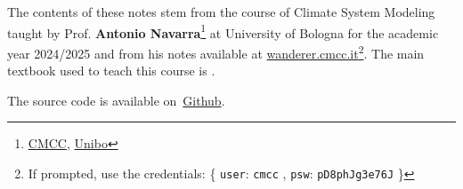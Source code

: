 \documentclass[
    11pt, 
    twoside, 
    english
]{book} %
\begin{document}


\clearpage

\vspace*{\fill}
The contents of these notes stem from the course of Climate System Modeling taught by Prof. \textbf{Antonio Navarra}\footnote{\href{https://www.cmcc.it/people/navarra-a}{CMCC}, \href{https://www.unibo.it/sitoweb/antonio.navarra/en}{Unibo}}
at University of Bologna for the academic year 2024/2025 and from his notes available at
\href{https://wanderer.cmcc.it}{wanderer.cmcc.it}\footnote{
	If prompted, use the credentials: \{ \texttt{user}: \texttt{cmcc}  ,
	\texttt{psw}: \texttt{pD8phJg3e76J} \} }.
The main textbook used to teach this course is \citet{Washington2005}.

The source code is available on~\href{https://github.com/niccolozanotti/climate-modeling/}{Github}.
\vspace*{\fill}

\tableofcontents
\newpage




%
%
%
%
%
%
%
%



%
%
%
%
%
%
%
%
%
%
%
%
%
%
%
\end{document}
